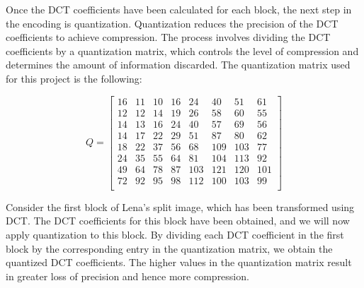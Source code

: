 \documentclass{article}
\begin{document}
Once the DCT coefficients have been calculated for each block, the next step in the encoding is quantization. Quantization reduces the precision of the DCT coefficients to achieve compression. The process involves dividing the DCT coefficients by a quantization matrix, which controls the level of compression and determines the amount of information discarded. The quantization matrix used for this project is the following:

\[
Q = \begin{bmatrix}
    16 & 11 & 10 & 16 & 24 & 40 & 51 & 61 \\
    12 & 12 & 14 & 19 & 26 & 58 & 60 & 55 \\
    14 & 13 & 16 & 24 & 40 & 57 & 69 & 56 \\
    14 & 17 & 22 & 29 & 51 & 87 & 80 & 62 \\
    18 & 22 & 37 & 56 & 68 & 109 & 103 & 77 \\
    24 & 35 & 55 & 64 & 81 & 104 & 113 & 92 \\
    49 & 64 & 78 & 87 & 103 & 121 & 120 & 101 \\
    72 & 92 & 95 & 98 & 112 & 100 & 103 & 99 \\
\end{bmatrix}
\]

Consider the first block of Lena's split image, which has been transformed using DCT. The DCT coefficients for this block have been obtained, and we will now apply quantization to this block. By dividing each DCT coefficient in the first block by the corresponding entry in the quantization matrix, we obtain the quantized DCT coefficients. The higher values in the quantization matrix result in greater loss of precision and hence more compression.
\end{document}
